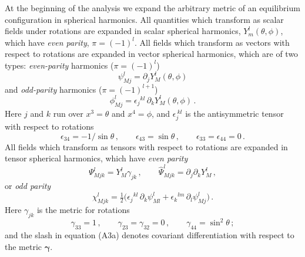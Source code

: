 At the beginning of the analysis we expand the arbitrary metric of an equilibrium configuration in spherical harmonics. All quantities which transform as scalar fields under rotations are
expanded in scalar spherical harmonics, $Y^l_m(\theta, \phi)$, which have \emph{even parity}, $\pi = (-1)^l$.
All fields which transform as vectors with respect to rotations are expanded in vector spherical
harmonics, which are of two types: \emph{even-parity} harmonics ($\pi = (-1)^l$)
%
\begin{equation}
\psi^l_{Mj} = \partial_j Y^l_M(\theta, \phi)
\label{eq:A1a}
\tag{A1a}
\end{equation}
%
and \emph{odd-parity} harmonics ($\pi = (-1)^{l+1}$)
%
\begin{equation}
\phi^l_{Mj} = \epsilon_j{}^{kl}\, \partial_k Y^l_M(\theta, \phi) \,.
\label{eq:A1b}
\tag{A1b}
\end{equation}
%
Here $j$ and $k$ run over $x^3 = \theta$ and $x^4 = \phi$, and $\epsilon_j^{\ kl}$ is the antisymmetric tensor with respect to
rotations
%
\begin{equation}
\epsilon_{34} = -1/\sin\theta \,, \qquad
\epsilon_{43} = \sin\theta \,, \qquad
\epsilon_{33} = \epsilon_{44} = 0 \,.
\label{eq:A2}
\tag{A2}
\end{equation}
%
All fields which transform as tensors with respect to rotations are expanded in tensor spherical
harmonics, which have \emph{even parity}
%
\begin{equation}
\Psi^l_{Mjk} = Y^l_M \gamma_{jk} \,, \qquad
\hat{\Psi}^l_{Mjk} = \partial_j \partial_k Y^l_M \,,
\label{eq:A3a}
\tag{A3a}
\end{equation}
%
or \emph{odd parity}
%
\begin{equation}
\chi^l_{Mjk} = \tfrac{1}{2}\bigl(\epsilon_j{}^{kl}\, \partial_k \psi^l_{Ml}
+ \epsilon_k{}^{lm}\, \partial_l \psi^l_{Mj}\bigr) \,.
\label{eq:A3b}
\tag{A3b}
\end{equation}
%
Here $\gamma_{jk}$ is the metric for rotations
%
\begin{equation}
\gamma_{33} = 1 \,, \qquad
\gamma_{23} = \gamma_{32} = 0 \,, \qquad
\gamma_{44} = \sin^2\theta \,;
\label{eq:A4}
\tag{A4}
\end{equation}
%
and the slash in equation (A3a) denotes covariant differentiation with respect to the metric $\boldsymbol{\gamma}$.
